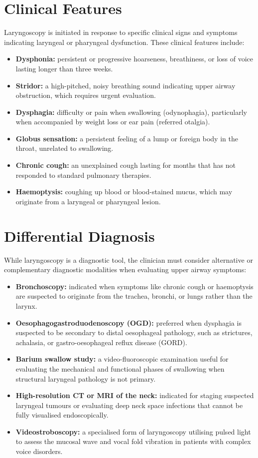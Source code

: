 \section*{Clinical Features}
Laryngoscopy is initiated in response to specific clinical signs and symptoms indicating laryngeal or pharyngeal dysfunction. These clinical features include:
\begin{itemize}
    \item \textbf{Dysphonia:} persistent or progressive hoarseness, breathiness, or loss of voice lasting longer than three weeks.
    \item \textbf{Stridor:} a high-pitched, noisy breathing sound indicating upper airway obstruction, which requires urgent evaluation.
    \item \textbf{Dysphagia:} difficulty or pain when swallowing (odynophagia), particularly when accompanied by weight loss or ear pain (referred otalgia).
    \item \textbf{Globus sensation:} a persistent feeling of a lump or foreign body in the throat, unrelated to swallowing.
    \item \textbf{Chronic cough:} an unexplained cough lasting for months that has not responded to standard pulmonary therapies.
    \item \textbf{Haemoptysis:} coughing up blood or blood-stained mucus, which may originate from a laryngeal or pharyngeal lesion.
\end{itemize}

\section*{Differential Diagnosis}
While laryngoscopy is a diagnostic tool, the clinician must consider alternative or complementary diagnostic modalities when evaluating upper airway symptoms:
\begin{itemize}
    \item \textbf{Bronchoscopy:} indicated when symptoms like chronic cough or haemoptysis are suspected to originate from the trachea, bronchi, or lungs rather than the larynx.
    \item \textbf{Oesophagogastroduodenoscopy (OGD):} preferred when dysphagia is suspected to be secondary to distal oesophageal pathology, such as strictures, achalasia, or gastro-oesophageal reflux disease (GORD).
    \item \textbf{Barium swallow study:} a video-fluoroscopic examination useful for evaluating the mechanical and functional phases of swallowing when structural laryngeal pathology is not primary.
    \item \textbf{High-resolution CT or MRI of the neck:} indicated for staging suspected laryngeal tumours or evaluating deep neck space infections that cannot be fully visualised endoscopically.
    \item \textbf{Videostroboscopy:} a specialised form of laryngoscopy utilising pulsed light to assess the mucosal wave and vocal fold vibration in patients with complex voice disorders.
\end{itemize}

